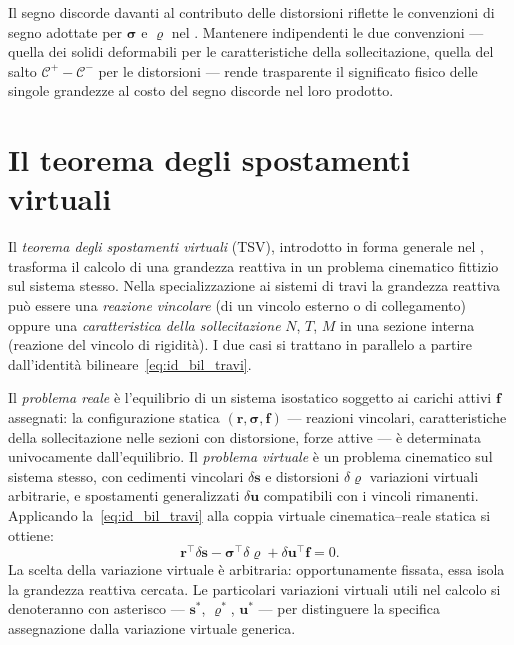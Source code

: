 \begin{oss}
	Il segno discorde davanti al contributo delle distorsioni
	riflette le convenzioni di segno adottate per
	$\bm{\sigma}$ e $\bm{\varrho}$ nel
	. Mantenere indipendenti le due
	convenzioni --- quella dei solidi deformabili per le
	caratteristiche della sollecitazione, quella del salto
	$\mathcal{C}^+ - \mathcal{C}^-$ per le distorsioni ---
	rende trasparente il significato fisico delle singole
	grandezze al costo del segno discorde nel loro prodotto.
\end{oss}



\section{Il teorema degli spostamenti virtuali}
\label{sec:TSV}

Il \emph{teorema degli spostamenti virtuali} (TSV),
introdotto in forma generale nel ,
trasforma il calcolo di una grandezza reattiva in un
problema cinematico fittizio sul sistema stesso. Nella
specializzazione ai sistemi di travi la grandezza reattiva
può essere una \emph{reazione vincolare} (di un vincolo
esterno o di collegamento) oppure una \emph{caratteristica
	della sollecitazione} $N$, $T$, $M$ in una sezione interna
(reazione del vincolo di rigidità). I due casi si trattano
in parallelo a partire dall'identità
bilineare~\eqref{eq:id_bil_travi}.

Il \emph{problema reale} è l'equilibrio di un sistema
isostatico soggetto ai carichi attivi $\bm{f}$ assegnati:
la configurazione statica $(\bm{r}, \bm{\sigma}, \bm{f})$
--- reazioni vincolari, caratteristiche della
sollecitazione nelle sezioni con distorsione, forze attive
--- è determinata univocamente dall'equilibrio. Il
\emph{problema virtuale} è un problema cinematico sul
sistema stesso, con cedimenti vincolari $\delta\bm{s}$ e
distorsioni $\delta\bm{\varrho}$ variazioni virtuali
arbitrarie, e spostamenti generalizzati $\delta\bm{u}$
compatibili con i vincoli rimanenti. Applicando
la~\eqref{eq:id_bil_travi} alla coppia virtuale
cinematica--reale statica si ottiene:
\begin{equation}\label{eq:TSV_generale}
	\bm{r}^\top\delta\bm{s} -
	\bm{\sigma}^\top\delta\bm{\varrho} +
	\delta\bm{u}^\top\bm{f} = 0.
\end{equation}
La scelta della variazione virtuale è arbitraria:
opportunamente fissata, essa isola la grandezza reattiva
cercata. Le particolari variazioni virtuali utili nel
calcolo si denoteranno con asterisco --- $\bm{s}^*$,
$\bm{\varrho}^*$, $\bm{u}^*$ --- per distinguere la
specifica assegnazione dalla variazione virtuale generica.

